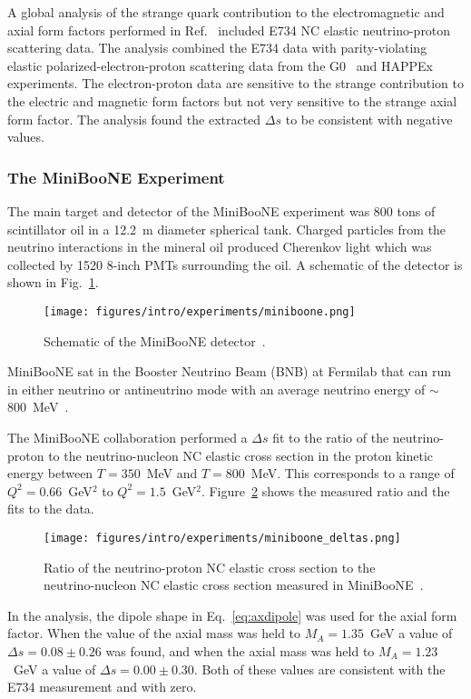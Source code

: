   A global analysis of the strange quark contribution to the electromagnetic
  and axial form factors performed in Ref.~\cite{Pate:2008va} included E734 NC
  elastic neutrino-proton scattering data. The analysis combined the E734 data
  with parity-violating elastic polarized-electron-proton scattering data from
  the G0~\cite{Armstrong:2005hs} and HAPPEx~\cite{Aniol:2004hp} experiments.
  The electron-proton data are sensitive to the strange contribution to the
  electric and magnetic form factors but not very sensitive to the strange
  axial form factor. The analysis found the extracted $\Delta s$ to be
  consistent with negative values.

  \subsubsection{The MiniBooNE Experiment}\label{sec:miniboonence}
  The main target and detector of the MiniBooNE experiment was 800 tons of
  scintillator oil in a 12.2~m diameter spherical tank. Charged particles
  from the neutrino interactions in the mineral oil produced Cherenkov light
  which was collected by 1520 8-inch PMTs surrounding the oil. A schematic of
  the detector is shown in Fig.~\ref{fig:miniboonedetector}.
  \begin{figure}[h]
    \centering
    \texttt{[image: figures/intro/experiments/miniboone.png]}
    \caption{Schematic of the MiniBooNE detector~\cite{Cheng:2012yy}.}
    \label{fig:miniboonedetector}
  \end{figure}
  MiniBooNE sat in the Booster Neutrino Beam (BNB) at Fermilab that can run
  in either neutrino or antineutrino mode with an average neutrino energy of
  $\sim$800~MeV~\cite{Aguilar-Arevalo:2008yp}.

  The MiniBooNE collaboration performed a $\Delta s$ fit to the ratio of the
  neutrino-proton to the neutrino-nucleon NC elastic cross section in the
  proton kinetic energy between $T = 350$~MeV and $T = 800$~MeV. This
  corresponds to a range of $Q^2 = 0.66$~GeV$^2$ to $Q^2 = 1.5$~GeV$^2$.
  Figure~\ref{fig:miniboonedeltas} shows the measured ratio and the fits to the
  data.
  \begin{figure}[h]
    \centering
    \texttt{[image: figures/intro/experiments/miniboone\_deltas.png]}
    \caption{Ratio of the neutrino-proton NC elastic cross section to the
    neutrino-nucleon NC elastic cross section measured in
    MiniBooNE~\cite{Aguilar-Arevalo:2010cx}.}
    \label{fig:miniboonedeltas}
  \end{figure}
  In the analysis, the dipole shape in Eq.~\ref{eq:axdipole} was used for the
  axial form factor. When the value of the axial mass was held to $M_A =
  1.35$~GeV a value of $\Delta s = 0.08 \pm 0.26$ was found, and when the axial
  mass was held to $M_A = 1.23$~GeV a value of $\Delta s = 0.00 \pm 0.30$. Both
  of these values are consistent with the E734 measurement and with zero.

